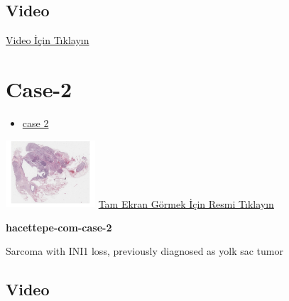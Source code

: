 \documentclass[
  letterpaper,
  DIV=11,
  numbers=noendperiod]{scrreprt}
\providecommand{\tightlist}{%
  \setlength{\itemsep}{0pt}\setlength{\parskip}{0pt}}\usepackage{longtable,booktabs,array}
\begin{document}
\hypertarget{video}{%
\subsection{Video}\label{video}}

\href{https://www.youtube.com/watch?v=nfFtViUXHqU}{Video İçin Tıklayın}

\hypertarget{sec-hacettepe-case-of-the-month-case-2}{%
\section{Case-2}\label{sec-hacettepe-case-of-the-month-case-2}}

\begin{itemize}
\tightlist
\item
  \href{https://www.youtube.com/watch?v=xHQihI19L5g\&ab_channel=KemalKosemehmetoglu}{case
  2}
\end{itemize}

\href{https://images.patolojiatlasi.com/hacettepe-com-case-2/HE.html}{\includegraphics[width=0.25\textwidth,height=\textheight]{./screenshots/hacettepe-com-case-2_screenshot.png}}
\href{https://images.patolojiatlasi.com/hacettepe-com-case-2/HE.html}{Tam
Ekran Görmek İçin Resmi Tıklayın}

\textbf{hacettepe-com-case-2}

\begin{tcolorbox}[enhanced jigsaw, left=2mm, toprule=.15mm, rightrule=.15mm, bottomrule=.15mm, leftrule=.75mm, colback=white, colframe=quarto-callout-tip-color-frame, toptitle=1mm, breakable, titlerule=0mm, colbacktitle=quarto-callout-tip-color!10!white, bottomtitle=1mm, title=\textcolor{quarto-callout-tip-color}{\faLightbulb}\hspace{0.5em}{Tanı}, arc=.35mm, opacitybacktitle=0.6, opacityback=0, coltitle=black]

Sarcoma with INI1 loss, previously diagnosed as yolk sac tumor

\end{tcolorbox}

\hypertarget{video-1}{%
\subsection{Video}\label{video-1}}
\end{document}

